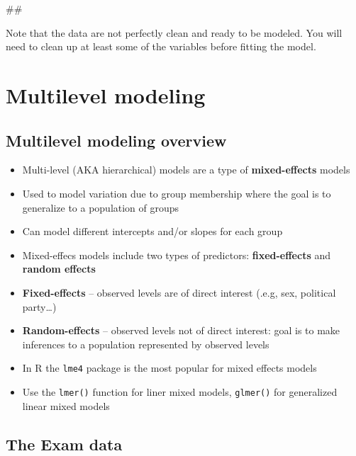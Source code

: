 \documentclass[]{book}
\newenvironment{Shaded}{\begin{snugshade}}{\end{snugshade}}
\newcommand{\NormalTok}[1]{#1}
\providecommand{\tightlist}{%
  \setlength{\itemsep}{0pt}\setlength{\parskip}{0pt}}
\begin{document}
\begin{Shaded}
\begin{Highlighting}[]
\NormalTok{## }
\end{Highlighting}
\end{Shaded}

Note that the data are not perfectly clean and ready to be modeled. You
will need to clean up at least some of the variables before fitting the
model.

\section{Multilevel modeling}\label{multilevel-modeling}

\subsection{Multilevel modeling
overview}\label{multilevel-modeling-overview}

\begin{itemize}
\tightlist
\item
  Multi-level (AKA hierarchical) models are a type of
  \textbf{mixed-effects} models
\item
  Used to model variation due to group membership where the goal is to
  generalize to a population of groups
\item
  Can model different intercepts and/or slopes for each group
\item
  Mixed-effecs models include two types of predictors:
  \textbf{fixed-effects} and \textbf{random effects}
\item
  \textbf{Fixed-effects} -- observed levels are of direct interest
  (.e.g, sex, political party\ldots{})
\item
  \textbf{Random-effects} -- observed levels not of direct interest:
  goal is to make inferences to a population represented by observed
  levels
\item
  In R the \texttt{lme4} package is the most popular for mixed effects
  models
\item
  Use the \texttt{lmer()} function for liner mixed models,
  \texttt{glmer()} for generalized linear mixed models
\end{itemize}

\subsection{The Exam data}\label{the-exam-data}
\end{document}
